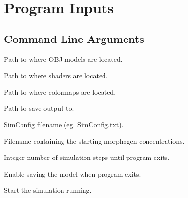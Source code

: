 \chapter{Program Inputs}

\section{Command Line Arguments}
\label{appendix:CLargs}
\begin{description}[itemsep=0cm]
    \item[ModelsPath=] Path to where OBJ models are located.
    \item[ShadersPath=] Path to where shaders are located.
    \item[ColorMapsPath=] Path to where colormaps are located.
    \item[SavePath=] Path to save output to.
    \item[ConfigFile=] SimConfig filename (eg. SimConfig.txt).
    \item[SimFile=] Filename containing the starting morphogen concentrations.
    \item[Steps=] Integer number of simulation steps until program exits.
    \item[SaveOnExit] Enable saving the model when program exits.
    \item[Run] Start the simulation running.
\end{description}

\pagebreak
